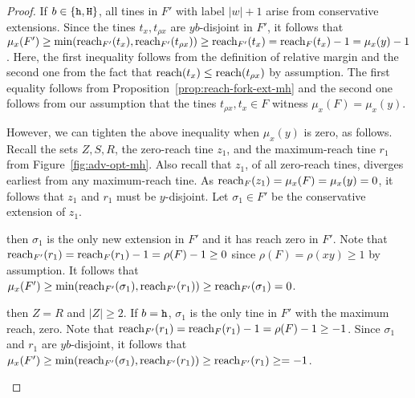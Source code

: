 \begin{proof}
  If $b \in \{\mathtt{h}, \mathtt{H}\}$, 
  all tines in $F'$ with label $|w| + 1$ arise from conservative extensions. 
  Since the tines $t_x, t_{\rho x}$ are $yb$-disjoint in $F'$, 
  it follows that $\mu_x(F') \geq \min(\operatorname{reach}_{F'}(t_x), \operatorname{reach}_{F'}(t_{\rho x})) \geq \operatorname{reach}_{F'}(t_x) = \operatorname{reach}_{F}(t_x) - 1 = \mu_x(y) - 1$. 
  Here, the first inequality follows from the definition of relative margin and 
  the second one from the fact that $\operatorname{reach}(t_x) \leq \operatorname{reach}(t_{\rho x})$ by assumption. 
  The first equality follows from Proposition~\ref{prop:reach-fork-ext-mh} and 
  the second one follows from our assumption that the tines $t_{\rho x}, t_x\in F$ witness $\mu_x(F) = \mu_x(y)$. 

  However, we can tighten the above inequality when $\mu_x(y)$ is zero, as follows. 
  Recall the sets $Z, S, R$, 
  the zero-reach tine $z_1$, 
  and the maximum-reach tine $r_1$ 
  from Figure~\ref{fig:adv-opt-mh}. 
  Also recall that $z_1$, of all zero-reach tines, 
  diverges earliest from any maximum-reach tine.
  As $\operatorname{reach}_F(z_1) = \mu_x(F) = \mu_x(y) = 0$, 
  it follows that 
  $z_1$ and $r_1$ must be $y$-disjoint.
  Let $\sigma_1 \in F'$ be the conservative extension of $z_1$.


  \begin{description}[font=\normalfont\itshape\space]
    \item[If $\rho(xy) \geq 1$ and $\mu_x(y) = 0$]
      then $\sigma_1$ is the only new extension in $F'$ 
      and it has reach zero in $F'$.
      Note that 
      $\operatorname{reach}_{F'}(r_1) = \operatorname{reach}_F(r_1) - 1 = \rho(F) - 1 \geq 0$ 
      since $\rho(F) = \rho(xy) \geq 1$ by assumption. 
      It follows that $\mu_x(F') \geq \min(\operatorname{reach}_{F'}(\sigma_1), \operatorname{reach}_{F'}(r_1) ) \geq \operatorname{reach}_{F'}(\sigma_1) = 0$. 




    \item[If $\rho(xy) = 0$ and $\mu_x(y) = 0$] 
      then $Z = R$ and $|Z| \geq 2$. 
      If $b = \mathtt{h}$, 
      $\sigma_1$
      is the only tine in $F'$ with the maximum reach, zero. 
      Note that 
      $\operatorname{reach}_{F'}(r_1) = \operatorname{reach}_F(r_1) - 1 = \rho(F) - 1 \geq -1$. 
      Since $\sigma_1$ and $r_1$ are $yb$-disjoint, 
      it follows that 
      $\mu_x(F') \geq \min(\operatorname{reach}_{F'}(\sigma_1), \operatorname{reach}_{F'}(r_1) ) 
      \geq \operatorname{reach}_{F'}(r_1) \geq = -1$.


\end{description}
\end{proof}
